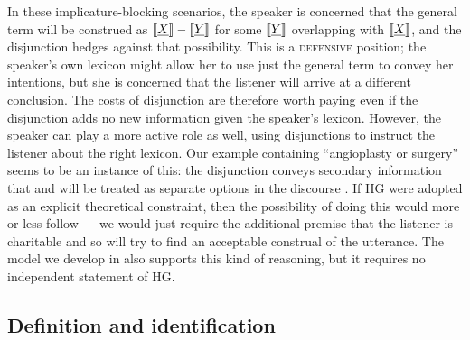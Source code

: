 \documentclass[12pt,twoside]{article}
\renewcommand{\_}{\textbf{\textunderscore\hspace{-4pt}\textunderscore\hspace{-3pt}\textunderscore\hspace{-4pt}\textunderscore}\hspace{0.5pt}}			%
\newcommand{\technicalTerm}[1]{\textsc{#1}}
\begin{document}

In these implicature-blocking scenarios, the speaker is concerned that
the general term  will be construed as
$\llbracket\emph{X\/}\rrbracket-\llbracket\emph{Y\/}\rrbracket$ for some $\llbracket\emph{Y\/}\rrbracket$
overlapping with $\llbracket\emph{X\/}\rrbracket$, and the disjunction hedges
against that possibility. This is a \technicalTerm{defensive}
position; the speaker's own lexicon might allow her to use just the
general term to convey her intentions, but she is concerned that the
listener will arrive at a different conclusion. The costs of
disjunction are therefore worth paying even if the disjunction adds no
new information given the speaker's lexicon.  However, the speaker can
play a more active role as well, using disjunctions to instruct the
listener about the right lexicon. Our 
example containing ``angioplasty or surgery'' seems to be an instance
of this: the disjunction conveys secondary information that
 and  will be treated as separate
options in the discourse \citep{Simons:2001}. If HG were adopted as an
explicit theoretical constraint, then the possibility of doing this
would more or less follow --- we would just require the additional
premise that the listener is charitable and so will try to find an
acceptable construal of the utterance. The model we develop in
 also supports this kind of reasoning, but it
requires no independent statement of HG.
 

\subsection{Definition and identification}\label{sec:data:definitional}
\end{document}
